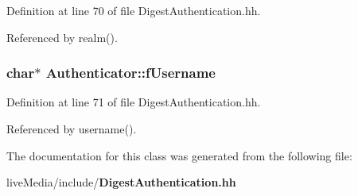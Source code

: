 Definition at line 70 of file Digest\+Authentication.\+hh.



Referenced by realm().

\subsubsection[{f\+Username}]{\setlength{\rightskip}{0pt plus 5cm}char$\ast$ Authenticator\+::f\+Username\hspace{0.3cm}{\ttfamily [private]}}\label{classAuthenticator_a4d0bbdd7d3951882b659e5655b84c480}


Definition at line 71 of file Digest\+Authentication.\+hh.



Referenced by username().



The documentation for this class was generated from the following file\+:\begin{DoxyCompactItemize}
\item 
live\+Media/include/{\bf Digest\+Authentication.\+hh}\end{DoxyCompactItemize}
